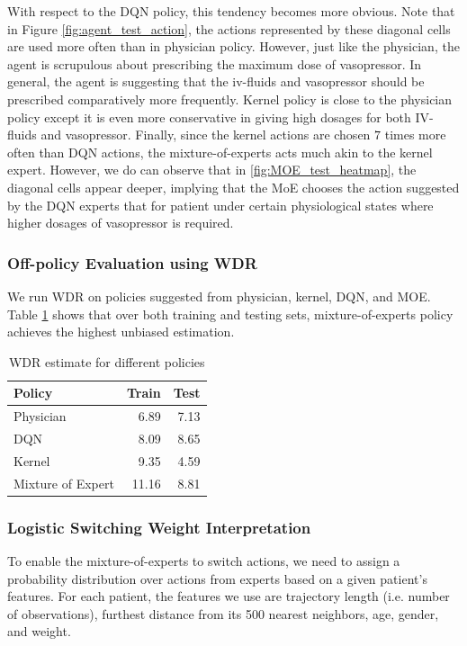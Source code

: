 \documentclass[letterpaper]{article}
\begin{document}
With respect to the DQN policy, this tendency becomes more obvious. Note that in Figure \ref{fig:agent_test_action}, the actions represented by these diagonal cells are used more often than in physician policy. However, just like the physician, the agent is scrupulous about prescribing the maximum dose of vasopressor. In general, the agent is suggesting that the iv-fluids and vasopressor should be prescribed comparatively more frequently. Kernel policy is close to the physician policy except it is even more conservative in giving high dosages for both IV-fluids and vasopressor. Finally, since the kernel actions are chosen $7$ times more often than DQN actions, the mixture-of-experts acts much akin to the kernel expert. However, we do can observe that in \ref{fig:MOE_test_heatmap}, the diagonal cells appear deeper, implying that the MoE chooses the action suggested by the DQN experts that for patient under certain physiological states where higher dosages of vasopressor is required.

\subsubsection{Off-policy Evaluation using WDR}

We run WDR on policies suggested from physician, kernel, DQN, and MOE. Table \ref{table:WDR_estimate} shows that over both training and testing sets, mixture-of-experts policy achieves the highest unbiased estimation.


\begin{table}[H]
\caption{\label{table:WDR_estimate}WDR estimate for different policies}
\centering
\begin{tabular}{|l|r|r|}
\hline
Policy & Train & Test \\ \hline
Physician & 6.89 & 7.13 \\ 
DQN & 8.09 & 8.65 \\ 
Kernel & 9.35 & 4.59 \\ 
Mixture of Expert & 11.16 & 8.81 \\
\hline
\end{tabular}
\end{table}

\subsubsection{Logistic Switching Weight Interpretation}
To enable the mixture-of-experts to switch actions, we need to assign a probability distribution over actions from experts based on a given patient's features. For each patient, the features we use are trajectory length (i.e. number of observations), furthest distance from its 500 nearest neighbors, age, gender, and weight.
\end{document}

